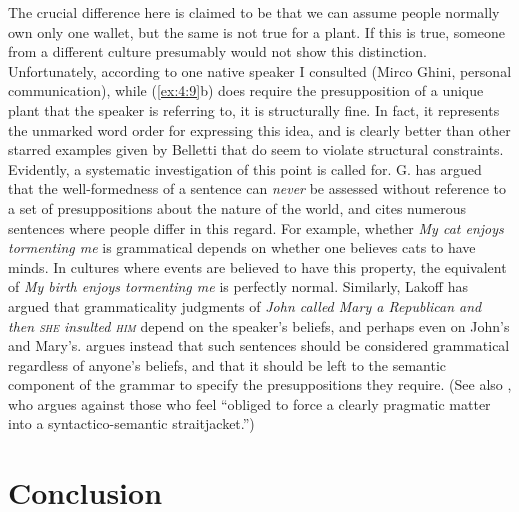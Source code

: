 \noindent
The crucial difference here is claimed to be that we can assume people normally own only one wallet, but the same is not true for a plant. If this is true, someone from a different culture presumably would not show this distinction. Unfortunately, according to one native speaker I consulted (Mirco Ghini, personal communication), while (\ref{ex:4:9}b) does require the presupposition of a unique plant that the speaker is referring to, it is structurally fine. In fact, it represents the unmarked word order for expressing this idea, and is clearly better than other starred examples given by Belletti that do seem to violate structural constraints. Evidently, a systematic investigation of this point is called for. G. \citet{Lakoff1971}
has argued that the well-formedness of a sentence can \textit{never} be assessed without reference to a set of presuppositions about the nature of the world, and cites numerous sentences where people differ in this regard. For example, whether \textit{My cat enjoys tormenting me} is grammatical depends on whether one believes cats to have minds. In cultures where events are believed to have this property, the equivalent of \textit{My birth enjoys tormenting me} is perfectly normal. Similarly, Lakoff has argued that grammaticality judgments of \textit{John called Mary a Republican and then \textsc{she} insulted \textsc{him}} 
depend on the speaker's beliefs, and perhaps even on John's and Mary's. \citet{Chomsky1972} argues instead that such sentences should be considered grammatical regardless of anyone's beliefs, and that it should be left to the semantic component of the grammar to specify the presuppositions they require. (See also \citet{BarHillel1971}, who argues against those who feel ``obliged to force a clearly pragmatic matter into a syntactico-semantic straitjacket.'')

\section{Conclusion} \label{sec:4.5}

